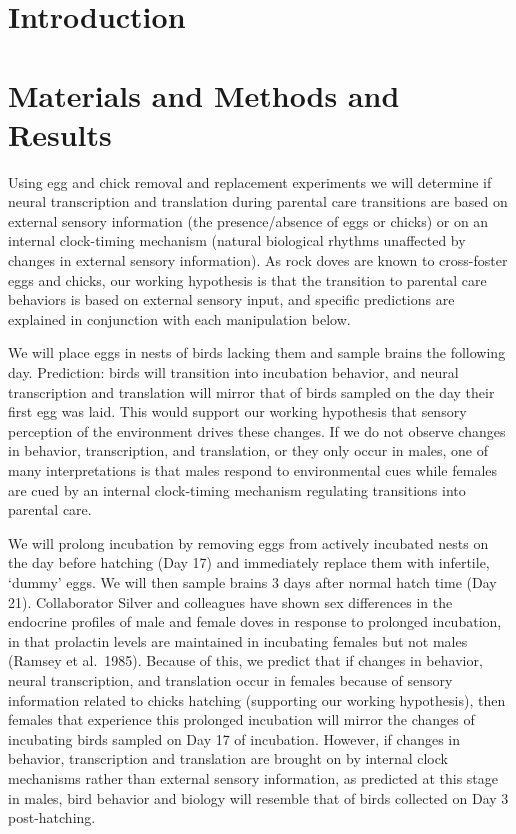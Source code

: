 \documentclass[10pt,letterpaper]{article}
\begin{document}
\linenumbers

\hypertarget{introduction}{%
\section{Introduction}\label{introduction}}

\hypertarget{materials-and-methods-and-results}{%
\section{Materials and Methods and
Results}\label{materials-and-methods-and-results}}

Using egg and chick removal and replacement experiments we will
determine if neural transcription and translation during parental care
transitions are based on external sensory information (the
presence/absence of eggs or chicks) or on an internal clock-timing
mechanism (natural biological rhythms unaffected by changes in external
sensory information). As rock doves are known to cross-foster eggs and
chicks, our working hypothesis is that the transition to parental care
behaviors is based on external sensory input, and specific predictions
are explained in conjunction with each manipulation below.

We will place eggs in nests of birds lacking them and sample brains the
following day. Prediction: birds will transition into incubation
behavior, and neural transcription and translation will mirror that of
birds sampled on the day their first egg was laid. This would support
our working hypothesis that sensory perception of the environment drives
these changes. If we do not observe changes in behavior, transcription,
and translation, or they only occur in males, one of many
interpretations is that males respond to environmental cues while
females are cued by an internal clock-timing mechanism regulating
transitions into parental care.

We will prolong incubation by removing eggs from actively incubated
nests on the day before hatching (Day 17) and immediately replace them
with infertile, `dummy' eggs. We will then sample brains 3 days after
normal hatch time (Day 21). Collaborator Silver and colleagues have
shown sex differences in the endocrine profiles of male and female doves
in response to prolonged incubation, in that prolactin levels are
maintained in incubating females but not males (Ramsey et al.~1985).
Because of this, we predict that if changes in behavior, neural
transcription, and translation occur in females because of sensory
information related to chicks hatching (supporting our working
hypothesis), then females that experience this prolonged incubation will
mirror the changes of incubating birds sampled on Day 17 of incubation.
However, if changes in behavior, transcription and translation are
brought on by internal clock mechanisms rather than external sensory
information, as predicted at this stage in males, bird behavior and
biology will resemble that of birds collected on Day 3 post-hatching.
\end{document}
